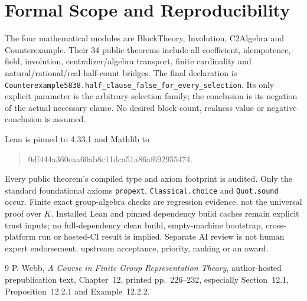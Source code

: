 \documentclass[11pt]{article}
\begin{document}
\section{Formal Scope and Reproducibility}
The four mathematical modules are BlockTheory, Involution, C2Algebra and
Counterexample. Their 34 public theorems include all coefficient,
idempotence, field, involution, centralizer/algebra transport, finite
cardinality and natural/rational/real half-count bridges.
The final declaration is
\texttt{Counterexample5838.half\_clause\_false\_for\_every\_selection}.
Its only explicit parameter is the arbitrary selection family; the
conclusion is its negation of the actual necessary clause. No desired
block count, realness value or negative conclusion is assumed.

Lean is pinned to 4.33.1 and Mathlib to
\begin{quote}\small\ttfamily
0df444a360eaa60ab8c11dca51a86af692955474.
\end{quote}
Every public theorem's compiled type and axiom footprint is audited.
Only the standard foundational axioms \texttt{propext},
\texttt{Classical.choice} and \texttt{Quot.sound} occur.
Finite exact group-algebra checks are regression evidence, not the
universal proof over $K$. Installed Lean and pinned dependency build caches
remain explicit trust inputs; no full-dependency clean build,
empty-machine bootstrap, cross-platform run or hosted-CI result is implied.
Separate AI review is not human expert endorsement, upstream acceptance,
priority, ranking or an award.

\begin{thebibliography}{9}
 P. Webb, \emph{A Course in Finite Group Representation Theory},
  author-hosted prepublication text, Chapter~12, printed pp.~226--232,
  especially Section~12.1, Proposition~12.2.1 and Example~12.2.2.
\end{thebibliography}
\end{document}
